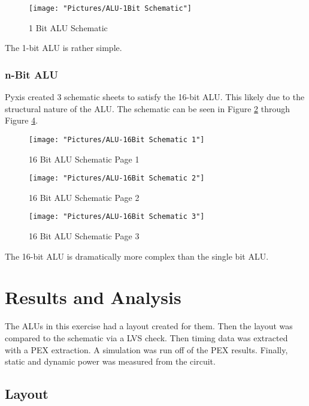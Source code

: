 \documentclass[11pt]{article}
\begin{document}
			\begin{figure}[H]
				\centering
				\texttt{[image: "Pictures/ALU-1Bit Schematic"]}
				\caption{1 Bit ALU Schematic}
				\label{fig:alu-1bit-schematic}
			\end{figure}
		
			The 1-bit ALU is rather simple.		

		\subsubsection{n-Bit ALU}
		
			Pyxis created 3 schematic sheets to satisfy the 16-bit ALU. This likely due to the structural nature of the ALU. The schematic can be seen in Figure \ref{fig:alu-16bit-schematic-1} through Figure \ref{fig:alu-16bit-schematic-3}.
			
			
			\begin{figure}[H]
				\centering
				\texttt{[image: "Pictures/ALU-16Bit Schematic 1"]}
				\caption{16 Bit ALU Schematic Page 1}
				\label{fig:alu-16bit-schematic-1}
			\end{figure}
		
			\begin{figure}[H]
				\centering
				\texttt{[image: "Pictures/ALU-16Bit Schematic 2"]}
				\caption{16 Bit ALU Schematic Page 2}
				\label{fig:alu-16bit-schematic-2}
			\end{figure}
		
			\begin{figure}[H]
				\centering
				\texttt{[image: "Pictures/ALU-16Bit Schematic 3"]}
				\caption{16 Bit ALU Schematic Page 3}
				\label{fig:alu-16bit-schematic-3}
			\end{figure}

			The 16-bit ALU is dramatically more complex than the single bit ALU.

\section{Results and Analysis}
		
	The ALUs in this exercise had a layout created for them. Then the layout was compared to the schematic via a LVS check. Then timing data was extracted with a PEX extraction. A simulation was run off of the PEX results. Finally, static and dynamic power was measured from the circuit.
		
	\subsection{Layout}
		
\end{document}
